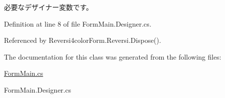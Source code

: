 必要なデザイナー変数です。 



Definition at line 8 of file Form\+Main.\+Designer.\+cs.



Referenced by Reversi4color\+Form.\+Reversi.\+Dispose().



The documentation for this class was generated from the following files\+:\begin{DoxyCompactItemize}
\item 
\hyperlink{_form_main_8cs}{Form\+Main.\+cs}\item 
Form\+Main.\+Designer.\+cs\end{DoxyCompactItemize}
